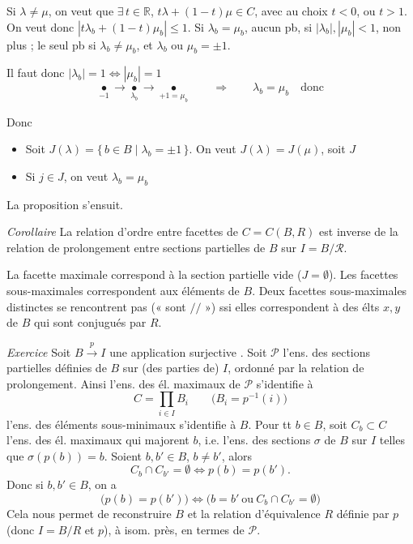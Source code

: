 \documentclass[11pt,a4paper]{article}
\begin{document}
Si $\lambda \neq \mu$, on veut que \struck{\ill{}}
$\exists\, t \in \mathbb{R}$, $t\lambda + (1-t)\mu \in C$, avec au choix $t < 0$,
ou $t > 1$. \struck{\ill{}} On veut  donc
$|t\lambda_b + (1-t)\mu_b| \leq 1$. Si $\lambda_b = \mu_b$, aucun pb, si
$|\lambda_b|, |\mu_b| < 1$, non plus ; le seul pb si $\lambda_b \neq \mu_b$,
et $\lambda_b$ ou $\mu_b = \pm 1$.

Il faut donc $|\lambda_b| = 1 \Leftrightarrow |\mu_b| = 1$
\[
  \underset{-1}{\bullet} \!\!\!\longrightarrow\!\!\!
  \underset{\lambda_b}{\bullet} \!\!\!\longrightarrow\!\!\!
  \underset{+1 = \mu_b}{\bullet}
  \qquad \Longrightarrow \qquad \lambda_b = \mu_b \quad \text{donc}
\]

Donc 
\begin{itemize}
  \item[a)] Soit $J(\lambda) = \{\, b \in B \mid \lambda_b = \pm 1 \,\}$. On veut
    $J(\lambda) = J(\mu)$, soit $J$
  \item[b)] Si $j \in J$, on veut $\lambda_b = \mu_b$
\end{itemize}

La proposition s'ensuit.

\emph{Corollaire} La relation d'ordre entre facettes de $C = C(B,R)$ est
inverse de la relation de prolongement entre sections partielles de $B$ sur
$I = B/\mathcal{R}$.

La facette maximale correspond à la section partielle vide ($J = \emptyset$).
Les facettes sous-maximales correspondent aux éléments de $B$. Deux facettes
sous-maximales distinctes  se
rencontrent pas (« sont $/\!/$ ») ssi elles correspondent à des élts $x, y$ de
$B$ qui sont conjugués par $R$.


\emph{Exercice} Soit $B \xrightarrow{p} I$ une application surjective
.
Soit $\mathcal{P}$ l'ens. des sections partielles définies de $B$ sur (des
parties de) $I$, \struck{\ill{}} ordonné par la relation de prolongement.
 Ainsi l'ens. des él. maximaux  de
$\mathcal{P}$ s'identifie à
\[
  C = \prod_{i\in I} B_i \qquad \bigl(B_i = p^{-1}(i)\bigr)
\]
l'ens. des éléments sous-minimaux
s'identifie à $B$. Pour tt $b \in B$, soit $C_b \subset C$ l'ens. des él.
maximaux  qui majorent $b$, i.e. l'ens. des sections $\sigma$
de $B$ sur $I$ telles que $\sigma(p(b)) = b$. Soient $b, b' \in B$,
$b \neq b'$, alors
\[
  C_b \cap C_{b'} = \emptyset \iff p(b) = p(b') .
\]
Donc si $b, b' \in B$, on a
\[
  \bigl(p(b) = p(b')\bigr) \iff \bigl(b = b' \ \text{ou}\ C_b \cap C_{b'} = \emptyset\bigr)
\]
Cela nous permet de reconstruire $B$ et la relation d'équivalence $R$ définie
par $p$ \struck{\ill{}} (donc $I = B/R$ et $p$), à isom. près, en termes de
$\mathcal{P}$.
\end{document}
